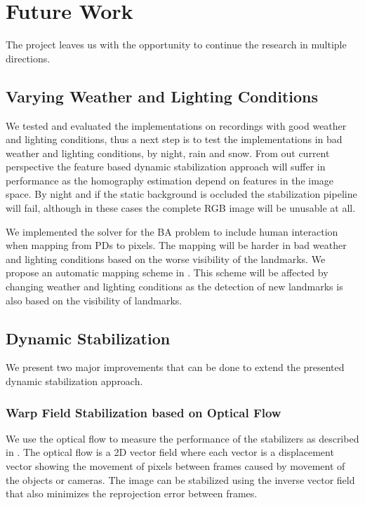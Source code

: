 
\section{Future Work}
The project leaves us with the opportunity to continue the research in multiple directions.

\subsection{Varying Weather and Lighting Conditions}
We tested and evaluated the implementations on recordings with good weather and lighting conditions, thus a next step is to test the implementations in bad weather and lighting conditions, \eg by night, rain and snow.
From out current perspective the feature based dynamic stabilization approach will suffer in performance as the homography estimation depend on features in the image space. 
By night and if the static background is occluded the stabilization pipeline will fail, although in these cases the complete RGB image will be unusable at all.

We implemented the solver for the BA problem to include human interaction when mapping from PDs to pixels.
The mapping will be harder in bad weather and lighting conditions based on the worse visibility of the landmarks.
We propose an automatic mapping scheme in .
This scheme will be affected by changing weather and lighting conditions as the detection of new landmarks is also based on the visibility of landmarks.


\subsection{Dynamic Stabilization}
We present two major improvements that can be done to extend the presented dynamic stabilization approach.

\subsubsection{Warp Field Stabilization based on Optical Flow}
We use the optical flow to measure the performance of the stabilizers as described in  .
The optical flow is a 2D vector field where each vector is a displacement vector showing the movement of pixels between frames caused by movement of the objects or cameras.
The image can be stabilized using the inverse vector field that also minimizes the reprojection error between frames.

